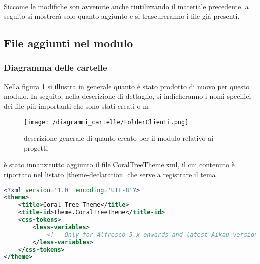 \paragraph{} Siccome le modifiche son avvenute anche riutilizzando il materiale precedente, a seguito si mostrerà solo quanto aggiunto e si trascureranno i file già presenti.
\subsection{File aggiunti nel modulo}
\subsubsection{Diagramma delle cartelle}
Nella figura \ref{fig:cartelle-tema} si illustra in generale quanto è stato prodotto di nuovo per questo modulo. In seguito, nella descrizione di dettaglio, si indicheranno i nomi specifici dei file più importanti che sono stati creati o m
\begin{figure}[!ht]
\centering
\texttt{[image: /diagrammi\_cartelle/FolderClienti.png]}
\caption{descrizione generale di quanto creato per il modulo relativo ai progetti\label{fig:cartelle-tema}}
\end{figure}
è stato innanzitutto aggiunto il file CoralTreeTheme.xml, il cui contenuto è riportato nel listato \ref{theme-declaration} che serve a registrare il tema
\begin{lstlisting}[language=XML, caption=XML della dichiarazione del tema, label=lst:theme-declaration]
<?xml version='1.0' encoding='UTF-8'?>
<theme>
    <title>Coral Tree Theme</title>
    <title-id>theme.CoralTreeTheme</title-id>
    <css-tokens>
        <less-variables>
            <!-- Only for Alfresco 5.x onwards and latest Aikau version -->
        </less-variables>
    </css-tokens>
</theme>
\end{lstlisting}
